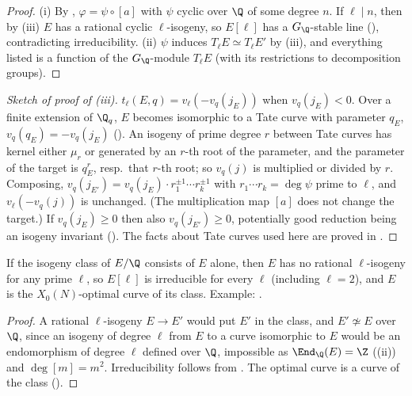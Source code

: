 \begin{proof}
(i) By , $\varphi=\psi\circ[a]$ with $\psi$ cyclic over $\Q$ of some degree $n$. If $\ell\mid n$, then by (iii) $E$ has a rational cyclic
$\ell$-isogeny, so $E[\ell]$ has a $G_\Q$-stable line (), contradicting irreducibility. (ii) $\psi$ induces $T_\ell E\simeq T_\ell E'$ by (iii), and
everything listed is a function of the $G_\Q$-module $T_\ell E$ (with its restrictions to decomposition groups).
\end{proof}

\begin{proof}[Sketch of proof of (iii)]
$t_\ell(E,q)=v_\ell(-v_q(j_E))$ when $v_q(j_E)<0$. Over a finite extension of
$\Q_q$, $E$ becomes isomorphic to a Tate curve with parameter $q_E$, $v_q(q_E)=-v_q(j_E)$ (). An isogeny of prime degree $r$ between Tate curves has kernel either $\mu_r$ or
generated by an $r$-th root of the parameter, and the parameter of the target is $q_E^r$, resp.\ that $r$-th root; so $v_q(j)$ is multiplied or divided by $r$. Composing, $v_q(j_{E'})=v_q(j_E)\cdot
r_1^{\pm1}\cdots r_k^{\pm1}$ with $r_1\cdots r_k=\deg\psi$ prime to $\ell$, and $v_\ell(-v_q(j))$ is unchanged. (The multiplication map $[a]$ does not change the target.) If $v_q(j_E)\ge0$ then also
$v_q(j_{E'})\ge0$, potentially good reduction being an isogeny invariant (). The facts about Tate curves used here are proved in .
\end{proof}

\begin{corollary}\label{cor:ellcurves:trivialclass}
If the isogeny class of $E/\Q$ consists of $E$ alone, then $E$ has no rational $\ell$-isogeny for any prime $\ell$, so $E[\ell]$ is irreducible for every $\ell$ (including $\ell=2$), and $E$ is the
$X_0(N)$-optimal curve of its class. Example: .
\end{corollary}

\begin{proof}
A rational $\ell$-isogeny $E\to E'$ would put $E'$ in the class, and $E'\not\simeq E$ over $\Q$, since an isogeny of degree $\ell$ from $E$ to a curve isomorphic to $E$ would be an endomorphism of
degree $\ell$ defined over $\Q$, impossible as $\End_\Q(E)=\Z$ ((ii)) and $\deg[m]=m^2$. Irreducibility follows from . The optimal curve is
a curve of the class ().
\end{proof}

